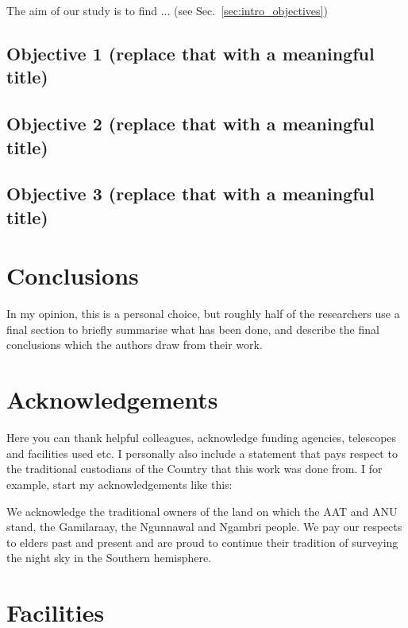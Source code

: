 \documentclass[fleqn,usenatbib]{mnras}
\begin{document}
The aim of our study is to find ... (see Sec.~\ref{sec:intro_objectives})

\subsection{Objective 1 (replace that with a meaningful title)} \label{sec:discussion_objective_1}

\subsection{Objective 2 (replace that with a meaningful title)} \label{sec:discussion_objective_2}

\subsection{Objective 3 (replace that with a meaningful title)} \label{sec:discussion_objective_3}


\section{Conclusions} \label{sec:conclusions}

In my opinion, this is a personal choice, but roughly half of the researchers use a final section to briefly summarise what has been done, and describe the final conclusions which the authors draw from their work.

\newpage

\section*{Acknowledgements}

Here you can thank helpful colleagues, acknowledge funding agencies, telescopes and facilities used etc. I personally also include a statement that pays respect to the traditional custodians of the Country that this work was done from. I for example, start my acknowledgements like this:

We acknowledge the traditional owners of the land on which the AAT and ANU stand, the Gamilaraay, the Ngunnawal and Ngambri people. We pay our respects to elders past and present and are proud to continue their tradition of surveying the night sky in the Southern hemisphere.


\section*{Facilities}
\end{document}
